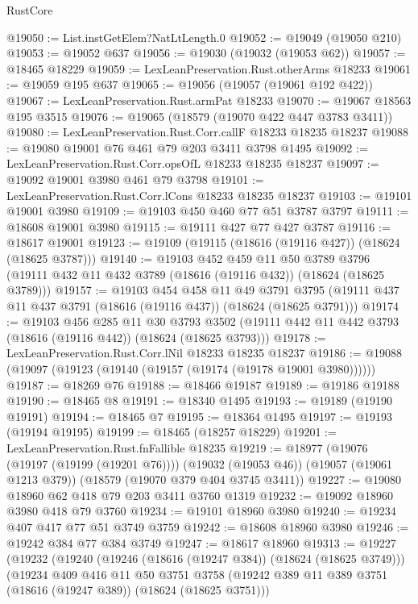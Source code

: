 \begin{lexlean}{RustCore}
\begin{coremodule}
@19050 := List.instGetElem?NatLtLength.{0}
@19052 := @19049 (@19050 @210)
@19053 := @19052 @637
@19056 := @19030 (@19032 (@19053 @62))
@19057 := @18465 @18229
@19059 := LexLeanPreservation.Rust.otherArms @18233
@19061 := @19059 @195 @637
@19065 := @19056 (@19057 (@19061 @192 @422))
@19067 := LexLeanPreservation.Rust.armPat @18233
@19070 := @19067 @18563 @195 @3515
@19076 := @19065 (@18579 (@19070 @422 @447 @3783 @3411))
@19080 := LexLeanPreservation.Rust.Corr.callF @18233 @18235 @18237
@19088 := @19080 @19001 @76 @461 @79 @203 @3411 @3798 @1495
@19092 := LexLeanPreservation.Rust.Corr.opsOfL @18233 @18235 @18237
@19097 := @19092 @19001 @3980 @461 @79 @3798
@19101 := LexLeanPreservation.Rust.Corr.lCons @18233 @18235 @18237
@19103 := @19101 @19001 @3980
@19109 := @19103 @450 @460 @77 @51 @3787 @3797
@19111 := @18608 @19001 @3980
@19115 := @19111 @427 @77 @427 @3787
@19116 := @18617 @19001
@19123 := @19109 (@19115 (@18616 (@19116 @427)) (@18624 (@18625 @3787)))
@19140 := @19103
    @452
    @459
    @11
    @50
    @3789
    @3796
    (@19111 @432 @11 @432 @3789 (@18616 (@19116 @432)) (@18624 (@18625 @3789)))
@19157 := @19103
    @454
    @458
    @11
    @49
    @3791
    @3795
    (@19111 @437 @11 @437 @3791 (@18616 (@19116 @437)) (@18624 (@18625 @3791)))
@19174 := @19103
    @456
    @285
    @11
    @30
    @3793
    @3502
    (@19111 @442 @11 @442 @3793 (@18616 (@19116 @442)) (@18624 (@18625 @3793)))
@19178 := LexLeanPreservation.Rust.Corr.lNil @18233 @18235 @18237
@19186 := @19088 (@19097 (@19123 (@19140 (@19157 (@19174 (@19178 @19001 @3980))))))
@19187 := @18269 @76
@19188 := @18466 @19187
@19189 := @19186 @19188
@19190 := @18465 @8
@19191 := @18340 @1495
@19193 := @19189 (@19190 @19191)
@19194 := @18465 @7
@19195 := @18364 @1495
@19197 := @19193 (@19194 @19195)
@19199 := @18465 (@18257 @18229)
@19201 := LexLeanPreservation.Rust.fnFallible @18235
@19219 := @18977
    (@19076 (@19197 (@19199 (@19201 @76))))
    (@19032 (@19053 @46))
    (@19057 (@19061 @1213 @379))
    (@18579 (@19070 @379 @404 @3745 @3411))
@19227 := @19080 @18960 @62 @418 @79 @203 @3411 @3760 @1319
@19232 := @19092 @18960 @3980 @418 @79 @3760
@19234 := @19101 @18960 @3980
@19240 := @19234 @407 @417 @77 @51 @3749 @3759
@19242 := @18608 @18960 @3980
@19246 := @19242 @384 @77 @384 @3749
@19247 := @18617 @18960
@19313 := @19227
    (@19232
      (@19240
        (@19246 (@18616 (@19247 @384)) (@18624 (@18625 @3749)))
        (@19234
          @409
          @416
          @11
          @50
          @3751
          @3758
          (@19242 @389 @11 @389 @3751 (@18616 (@19247 @389)) (@18624 (@18625 @3751)))

\end{coremodule}
\end{lexlean}
